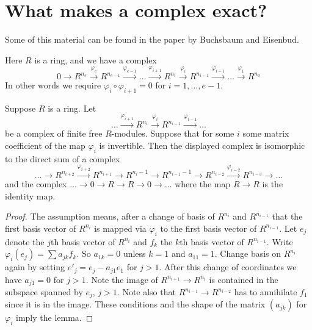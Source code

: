 \section{What makes a complex exact?}
\label{section-complex-exact}

\noindent
Some of this material can be found in the paper \cite{WhatExact}
by Buchsbaum and Eisenbud.

\begin{situation}
\label{situation-complex}
Here $R$ is a ring, and we have a complex
$$
0
\to
R^{n_e}
\xrightarrow{\varphi_e}
R^{n_{e-1}}
\xrightarrow{\varphi_{e-1}}
\ldots
\xrightarrow{\varphi_{i + 1}}
R^{n_i}
\xrightarrow{\varphi_i}
R^{n_{i-1}}
\xrightarrow{\varphi_{i-1}}
\ldots
\xrightarrow{\varphi_1}
R^{n_0}
$$
In other words we require $\varphi_i \circ \varphi_{i + 1} = 0$
for $i = 1, \ldots, e - 1$.
\end{situation}

\begin{lemma}
\label{lemma-add-trivial-complex}
Suppose $R$ is a ring. Let
$$
\ldots
\xrightarrow{\varphi_{i + 1}}
R^{n_i}
\xrightarrow{\varphi_i}
R^{n_{i-1}}
\xrightarrow{\varphi_{i-1}}
\ldots
$$
be a complex of finite free $R$-modules. Suppose that for some $i$
some matrix coefficient of the map $\varphi_i$ is invertible.
Then the displayed complex is isomorphic to the direct sum of a complex
$$
\ldots \to
R^{n_{i + 2}} \xrightarrow{\varphi_{i + 2}}
R^{n_{i + 1}} \to
R^{n_i - 1} \to
R^{n_{i - 1} - 1} \to
R^{n_{i - 2}} \xrightarrow{\varphi_{i - 2}}
R^{n_{i - 3}} \to
\ldots
$$
and the complex $\ldots \to 0 \to R \to R \to 0 \to \ldots$
where the map $R \to R$ is the identity map.
\end{lemma}

\begin{proof}
The assumption means, after a change of basis of
$R^{n_i}$ and $R^{n_{i-1}}$ that the first basis
vector of $R^{n_i}$ is mapped via $\varphi_i$ to the first basis
vector of $R^{n_{i-1}}$. Let $e_j$ denote the
$j$th basis vector of $R^{n_i}$ and $f_k$ the $k$th
basis vector of $R^{n_{i-1}}$. Write $\varphi_i(e_j)
= \sum a_{jk} f_k$. So $a_{1k} = 0$ unless $k = 1$
and $a_{11} = 1$. Change basis on $R^{n_i}$ again
by setting $e'_j = e_j - a_{j1} e_1$ for $j > 1$.
After this change of coordinates we have $a_{j1} = 0$
for $j > 1$. Note the image
of $R^{n_{i + 1}} \to R^{n_i}$ is contained in the
subspace spanned by $e_j$, $j > 1$. Note also
that $R^{n_{i-1}} \to R^{n_{i-2}}$ has to annihilate
$f_1$ since it is in the image. These conditions
and the shape of the matrix $(a_{jk})$ for $\varphi_i$
imply the lemma.
\end{proof}

